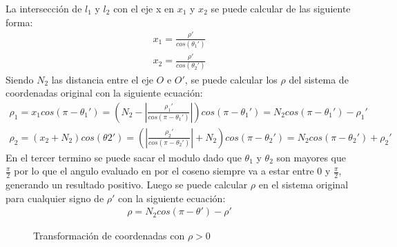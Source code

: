 \documentclass[a4paper,spanish]{article}
\begin{document}
La intersección de $l_1$  y $l_2$ con el eje x en $x_1$ y $x_2$ se puede calcular de las siguiente forma:
\begin{align*}
x_1 = \frac{\rho'}{cos(\theta_{1}')}\\
x_2 = \frac{\rho'}{cos(\theta_{2}')} 
\end{align*}
  Siendo $N_2$ las distancia entre el eje $O$ e $O'$, se puede calcular los  $\rho$ del sistema de coordenadas original con la siguiente ecuación:
\begin{align*}
\rho_1  = x_1 cos(\pi - \theta_{1}')=\left(N_2 - \left| \frac{\rho_{1}'}{cos(\pi - \theta_{1}')}\right|\right) cos(\pi - \theta_{1}')  = N_2 cos(\pi - \theta_{1}') - \rho_{1}'\\
\rho_2 = ( x_2 + N_2 )  cos(\theta{2}')=\left(\left|\frac{\rho_{2}'}{cos(\pi-\theta_{2}')}\right|+N_2\right) cos(\pi - \theta_{2}') = N_2 cos(\pi - \theta_{2}') + \rho_{2}'
\end{align*}
En el tercer termino se puede sacar el modulo dado que $\theta_{1}$ y $\theta_{2}$ son mayores que $ \frac{\pi}{2}$ por lo que el angulo evaluado en por el coseno siempre va a estar entre 0 y $ \frac{\pi}{2}$, generando un resultado positivo. Luego se puede calcular $\rho$ en el sistema original para cualquier signo de $\rho'$ con la siguiente ecuación:
\begin{align*}
\rho = N_2 cos(\pi - \theta') - \rho'
\end{align*}

\begin{figure}[H]



\caption{Transformación de coordenadas con $\rho > 0 $}
\label{fig:rho_positivo}
\end{figure}
\end{document}
